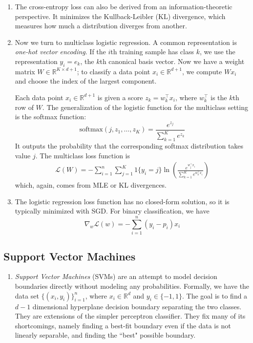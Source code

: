 \documentclass[10pt]{article}
\begin{document}
\begin{multicols}{2}
\begin{addmargin}[0.8em]{0.5em}
\begin{enumerate}[label=(\alph*)]
        \item The cross-entropy loss can also be derived from an information-theoretic perspective. It minimizes the Kullback-Leibler (KL) divergence, which measures how much a distribution diverges from another.
        
        \item Now we turn to multiclass logistic regression. A common representation is \textit{one-hot vector encoding}. If the $i$th training sample has class $k$, we use the representation $y_i = e_k$, the $k$th canonical basis vector. Now we have a weight matrix $W \in \mathbb{R}^{K \times d+1}$; to classify a data point $x_i \in \mathbb{R}^{d+1}$, we compute $Wx_i$ and choose the index of the largest component.
        
        Each data point $x_i \in \mathbb{R}^{d+1}$ is given a score $z_k = w_k^\top x_i$, where $w_k^\top$ is the $k$th row of $W$. The generalization of the logistic function for the multiclass setting is the softmax function:
        $$
        \text{softmax}(j, z_1, \hdots, z_K) = \frac{e^{z_j}}{\sum_{k=1}^K e^{z_k}}
        $$
        It outputs the probability that the corresponding softmax distribution takes value $j$.
        The multiclass loss function is
        \begin{align*}
            \mathcal{L}(W) = -\sum_{i=1}^{n}\sum_{j=1}^{K} 1\{ y_i = j \} \ln \left( \frac{e^{w_j^\top x_i}}{\sum_{k=1}^K e^{w_k^\top x_i }} \right)
        \end{align*}
        which, again, comes from MLE or KL divergences.
        
        \item The logistic regression loss function has no closed-form solution, so it is typically minimized with SGD. For binary classification, we have
        $$
        \nabla_w \mathcal{L}(w) = -\sum_{i=1}^{n} (y_i - p_i)x_i
        $$
    \end{enumerate}    
    \subsection{Support Vector Machines}
    \vspace{-0.2cm}
    \begin{enumerate}[label=(\alph*)]
        \item \textit{Support Vector Machines} (SVMs) are an attempt to model decision boundaries directly without modeling any probabilities. Formally, we have the data set $\{ (x_i, y_i) \}_{i=1}^{n}$, where $x_i \in \mathbb{R}^d$ and $y_i \in \{-1,1\}$. The goal is to find a $d-1$ dimensional hyperplane decision boundary separating the two classes. They are extensions of the simpler perceptron classifier. They fix many of its shortcomings, namely finding a best-fit boundary even if the data is not linearly separable, and finding the ``best" possible boundary. 
        

\end{enumerate}
\end{addmargin}
\end{multicols}
\end{document}
